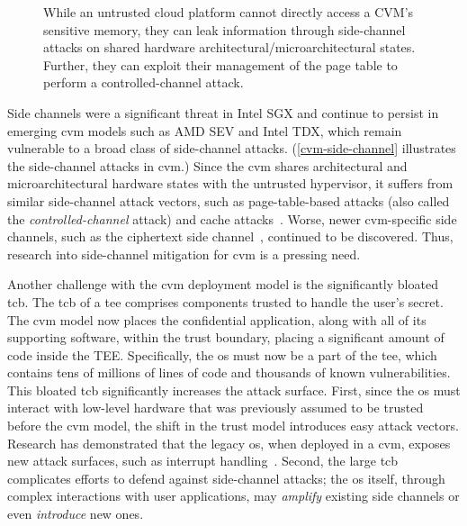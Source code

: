 \begin{figure}[t]
	\centering
  
  \caption{While an untrusted cloud platform cannot directly access a CVM's sensitive memory, they can leak information through side-channel attacks on shared hardware architectural/microarchitectural states. Further, they can exploit their management of the page table to perform a controlled-channel attack.}\label{cvm-side-channel}
\end{figure}

Side channels were a significant threat in Intel SGX and continue to persist in emerging \gls{cvm} models such as AMD SEV and Intel TDX, which remain vulnerable to a broad class of side-channel attacks.
(\autoref{cvm-side-channel} illustrates the side-channel attacks in \gls{cvm}.)
Since the \gls{cvm} shares architectural and microarchitectural hardware states with the untrusted hypervisor, it suffers from similar side-channel attack vectors, such as page-table-based attacks (also called the \emph{controlled-channel} attack) and cache attacks~\cite{sevstep}.
Worse, newer \gls{cvm}-specific side channels, such as the ciphertext side channel~\cite{li2021cipherleaks,ciphersteal}, continued to be discovered.
Thus, research into side-channel mitigation for \gls{cvm} is a pressing need.

Another challenge with the \gls{cvm} deployment model is the significantly bloated \gls{tcb}.
The \gls{tcb} of a \gls{tee} comprises components trusted to handle the user's secret.
The \gls{cvm} model now places the confidential application, along with all of its supporting software, within the trust boundary, placing a significant amount of code inside the TEE.
Specifically, the \gls{os} must now be a part of the \gls{tee}, which contains tens of millions of lines of code and thousands of known vulnerabilities.
This bloated \gls{tcb} significantly increases the attack surface.
First, since the \gls{os} must interact with low-level hardware that was previously assumed to be trusted before the \gls{cvm} model, the shift in the trust model introduces easy attack vectors.
Research has demonstrated that the legacy \gls{os}, when deployed in a \gls{cvm}, exposes new attack surfaces, such as interrupt handling~\cite{wesee,heckler}.
Second, the large \gls{tcb} complicates efforts to defend against side-channel attacks; the \gls{os} itself, through complex interactions with user applications, may \emph{amplify} existing side channels or even \emph{introduce} new ones.




